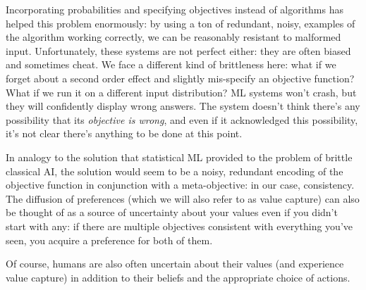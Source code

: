 \documentclass{article}
\begin{document}
	Incorporating probabilities and specifying objectives instead of algorithms has helped this problem enormously: by using a ton of redundant, noisy, examples of the algorithm working correctly, we can be reasonably resistant to malformed input. Unfortunately, these systems are not perfect either: they are often biased and sometimes cheat. We face a different kind of brittleness here: what if we forget about a second order effect and slightly mis-specify an objective function? What if we run it on a different input distribution? ML systems won't crash, but they will confidently display  wrong answers. The system doesn't think there's any possibility that its \textit{objective is wrong}, and even if it acknowledged this possibility, it's not clear there's anything to be done at this point.
	
	{\color{green!30!black}In analogy to the solution that statistical ML provided to the problem of brittle classical AI, the solution would seem to be a noisy, redundant encoding of the objective function in conjunction with a meta-objective: in our case, consistency. The diffusion of preferences (which we will also refer to as value capture) can also be thought of as a source of uncertainty about your values even if you didn't start with any: if there are multiple objectives consistent with everything you've seen, you acquire a preference for both of them.}

	Of course, humans are also often uncertain about their values (and experience value capture) in addition to their beliefs and the appropriate choice of actions.
	


	
\end{document}

